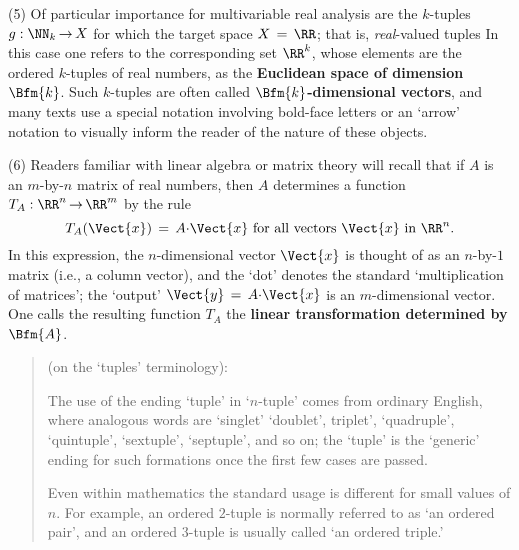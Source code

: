 {\V

        (5) Of particular importance for multivariable real analysis are the $k$-tuples $g:{\NN}_{k} \,{\rightarrow}\, X$ for which the target space $X \,=\, {\RR}$; that is, {\em real}-valued tuples
    In this case one refers to the corresponding set ${\RR}^{k}$, whose elements are the ordered $k$-tuples of real numbers,
    as the {\bf Euclidean space of dimension $\Bfm{k}$}.
    Such $k$-tuples are often called {\bf $\Bfm{k}$-dimensional vectors}, and many texts use a special notation involving bold-face letters or an `arrow' notation to visually inform the reader of the nature of these objects.


\V

        (6) Readers familiar with linear algebra or matrix theory will recall that if $A$ is an $m$-by-$n$ matrix of real numbers,
    then $A$ determines a function $T_{A}:{\RR}^{n} \,{\rightarrow}\, {\RR}^{m}$ by the rule
        \begin{displaymath}
        T_{A}(\Vect{x}) \,=\, A{\cdot}\Vect{x} \mbox{ for all vectors $\Vect{x}$ in ${\RR}^{n}$}.
        \end{displaymath}
    In this expression, the $n$-dimensional vector $\Vect{x}$ is thought of as an $n$-by-$1$ matrix (i.e., a column vector),
    and the `dot' denotes the standard `multiplication of  matrices'; the `output' $\Vect{y} \,=\, A{\cdot}\Vect{x}$ is an $m$-dimensional vector.
    One calls the resulting function $T_{A}$ the {\bf linear transformation determined by $\Bfm{A}$}.


\V
\V

\begin{quotation}
{\footnotesize \underline{\Notes} (on the `tuples' terminology):

\V

        The use of the ending `tuple' in `$n$-tuple' comes from ordinary English, where analogous words are `singlet' `doublet', triplet', `quadruple', `quintuple', `sextuple', `septuple', and so on;
    the `tuple' is the `generic' ending for such formations once the first few cases are passed.

        Even within mathematics the standard usage is different for small values of $n$.
    For example, an ordered $2$-tuple is normally referred to as `an ordered pair', and an ordered $3$-tuple is usually called `an ordered triple.'

}%
\end{quotation} 
}%

